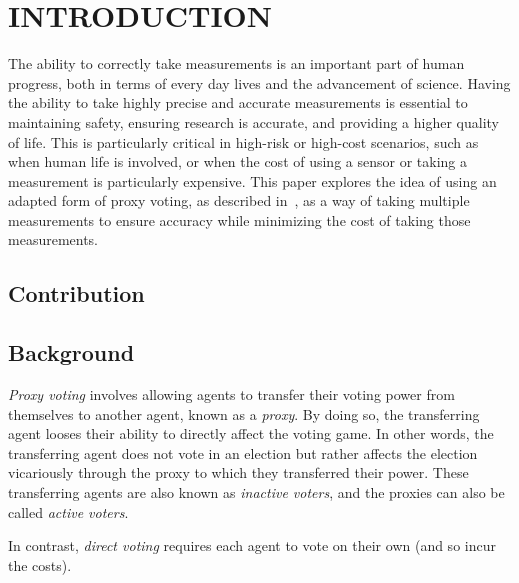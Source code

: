 %
%

\chapter{INTRODUCTION}\label{ch:introduction}
\thispagestyle{empty}

The ability to correctly take measurements is an important part of human
progress, both in terms of every day lives and the advancement of science.
Having the ability to take highly precise and accurate measurements is essential
to maintaining safety, ensuring research is accurate, and providing a higher
quality of life.
This is particularly critical in high-risk or high-cost scenarios, such as when
human life is involved, or when the cost of using a sensor or taking a
measurement is particularly expensive.  %
This paper explores the idea of using an adapted form of proxy voting, as
described in~\cite[para. 1.3]{Miller1969}, as a way of taking multiple
measurements to ensure accuracy while minimizing the cost of taking those
measurements.



\section{Contribution}\label{sec:contribution}


\section{Background}\label{sec:Background}
\textit{Proxy voting} involves allowing agents to transfer their voting power
from themselves to another agent, known as a \textit{proxy}\cite[para. 1.4]
{Cohensius2017}.
By doing so, the transferring agent looses their ability to directly affect the
voting game.
In other words, the transferring agent does not vote in an election but rather
affects the election vicariously through the proxy to which they transferred
their power.
These transferring agents are also known as \textit{inactive voters}, and the
proxies can also be called \textit{active voters}.

In contrast, \textit{direct voting} requires each agent to vote on their own
(and so incur the costs).

